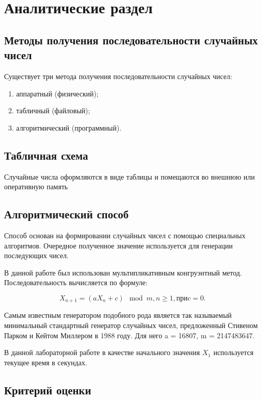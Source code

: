 \section{Аналитические раздел}

\subsection{Методы получения последовательности случайных чисел}

Существует три метода получения последовательности случайных чисел:

\begin{enumerate}
	\item аппаратный (физический);
	\item табличный (файловый);
	\item алгоритмический (программный).
\end{enumerate}

\subsection{Табличная схема}

Случайные числа оформляются в виде таблицы и помещаются во внешнюю или оперативную память

\subsection{Алгоритмический способ}

Способ основан на формировании случайных чисел с помощью
специальных алгоритмов. Очередное полученное значение используется для
генерации последующих чисел.

В данной работе был использован мультипликативным конгруэнтный
метод. Последовательность вычисляется по формуле:

\begin{equation}
	X_{n+1} = (aX_{n} + c) \mod m, n \geqslant 1, при c = 0.
\end{equation}

Самым известным генератором подобного рода является так называемый
минимальный стандартный генератор случайных чисел, предложенный
Стивеном Парком и Кейтом Миллером в 1988 году. Для него a = 16807,
m = 2147483647.

В данной лабораторной работе в качестве начального значения $X_{1}$
используется текущее время в секундах.

\subsection{Критерий оценки}

